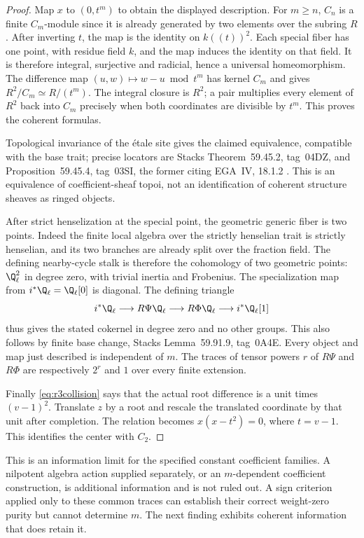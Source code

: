 \begin{proof}
Map $x$ to $(0,t^m)$ to obtain the displayed description. For $m\ge n$,
$C_n$ is a finite $C_m$-module since it is already generated by two
elements over the subring $R$. After inverting $t$, the map is the
identity on $k((t))^2$. Each special fiber has one point, with residue
field $k$, and the map induces the identity on that field. It is
therefore integral, surjective and radicial, hence a universal
homeomorphism. The difference map
$(u,w)\mapsto w-u\bmod t^m$ has kernel $C_m$ and gives
$R^2/C_m\simeq R/(t^m)$. The integral closure is $R^2$; a pair multiplies
every element of $R^2$ back into $C_m$ precisely when both coordinates
are divisible by $t^m$. This proves the coherent formulas.

Topological invariance of the \'etale site gives the claimed equivalence,
compatible with the base trait; precise locators are Stacks
Theorem~59.45.2, tag~04DZ, and Proposition~59.45.4, tag~03SI,
the former citing EGA~IV, 18.1.2 \cite{StacksNil}.
This is an equivalence of coefficient-sheaf topoi, not an identification
of coherent structure sheaves as ringed objects.

After strict henselization at the special point, the geometric generic
fiber is two points. Indeed the finite local algebra over the strictly
henselian trait is strictly henselian, and its two branches are already
split over the fraction field. The defining nearby-cycle stalk is
therefore the cohomology of two geometric points: $\Q_\ell^2$ in degree
zero, with trivial inertia and Frobenius. The specialization map from
$i^*\Q_\ell=\Q_\ell[0]$ is diagonal. The defining triangle
\[
 i^*\Q_\ell\longrightarrow R\Psi\Q_\ell
 \longrightarrow R\Phi\Q_\ell\longrightarrow i^*\Q_\ell[1]
\]
thus gives the stated cokernel in degree zero and no other groups.
This also follows by finite base change, Stacks Lemma~59.91.9,
tag~0A4E. Every object and map just described is independent of $m$.
The traces of tensor powers $r$ of $R\Psi$ and $R\Phi$ are respectively
$2^r$ and $1$ over every finite extension.

Finally \eqref{eq:r3collision} says that the actual root difference is
a unit times $(v-1)^2$. Translate $z$ by a root and rescale the translated
coordinate by that unit after completion. The relation becomes
$x(x-t^2)=0$, where $t=v-1$. This identifies the center with $C_2$.
\end{proof}
This is an information limit for the specified constant coefficient
families. A nilpotent algebra action supplied separately, or an
$m$-dependent coefficient construction, is additional information and
is not ruled out. A sign criterion applied only to these common traces
can establish their correct weight-zero purity but cannot determine
$m$. The next finding exhibits coherent information that does retain it.

